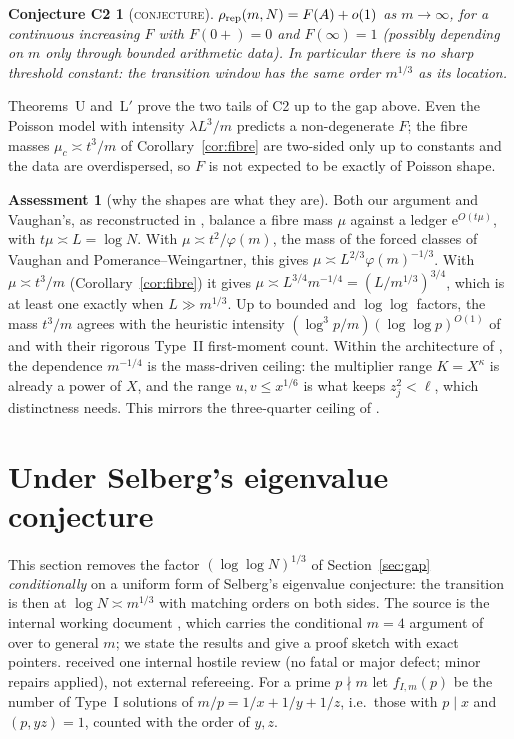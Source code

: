 \documentclass[10pt,reqno]{amsart}
\newtheorem*{conjC2}{Conjecture C2}
\theoremstyle{definition}
\newtheorem{assessment}[theorem]{Assessment}
\newcommand{\e}{\mathrm e}
\newcommand{\status}[1]{\textup{\textsc{#1}}}
\begin{document}
\begin{conjC2}[\status{conjecture}]
$\rho_{\rm rep}(m,N)=F(A)+o(1)$ as $m\to\infty$, for a continuous
increasing $F$ with $F(0+)=0$ and $F(\infty)=1$ \textup{(}possibly
depending on $m$ only through bounded arithmetic data\textup{)}.  In
particular there is no sharp threshold constant: the transition window
has the same order $m^{1/3}$ as its location.
\end{conjC2}

Theorems~U and~L$'$ prove the two tails of C2 up to the gap above.  Even
the Poisson model with intensity $\lambda L^3/m$ predicts a
non-degenerate $F$; the fibre masses $\mu_c\asymp t^3/m$ of
Corollary~\ref{cor:fibre} are two-sided only up to constants and the data
are overdispersed, so $F$ is not expected to be exactly of Poisson shape.

\begin{assessment}[why the shapes are what they are]\label{ass:shape}
Both our argument and Vaughan's, as reconstructed in \cite[\S4]{PW},
balance a fibre mass $\mu$ against a
ledger $\e^{O(t\mu)}$, with $t\mu\asymp L=\log N$.  With
$\mu\asymp t^2/\varphi(m)$, the mass of the forced classes of Vaughan and
Pomerance--Weingartner, this gives $\mu\asymp L^{2/3}\varphi(m)^{-1/3}$.
With $\mu\asymp t^3/m$ (Corollary~\ref{cor:fibre}) it gives
$\mu\asymp L^{3/4}m^{-1/4}=(L/m^{1/3})^{3/4}$, which is at least one
exactly when $L\gg m^{1/3}$.  Up to bounded and $\log\log$ factors, the
mass $t^3/m$ agrees with the heuristic intensity
$(\log^3p/m)(\log\log p)^{O(1)}$ of \cite[p.~3]{PW} and with their
rigorous Type~II first-moment count.  Within the architecture of
\cite{TQ}, the dependence $m^{-1/4}$ is the mass-driven ceiling: the
multiplier range $K=X^\kappa$ is already a power of $X$, and the range
$u,v\leq x^{1/6}$ is what keeps $z_j^2<\ell$, which distinctness needs.
This mirrors the three-quarter ceiling of \cite[\S10]{TQ}.
\end{assessment}

\section{Under Selberg's eigenvalue conjecture}\label{sec:sel}
This section removes the factor $(\log\log N)^{1/3}$ of
Section~\ref{sec:gap} \emph{conditionally} on a uniform form of Selberg's
eigenvalue conjecture: the transition is then at $\log N\asymp m^{1/3}$
with matching orders on both sides.  The source is the internal working
document \cite{MN4}, which carries the conditional $m=4$ argument of
\cite[Thm.~8.2]{HN} over to general $m$; we state the results and give a
proof sketch with exact pointers.  \cite{MN4} received one internal
hostile review (no fatal or major defect; minor repairs applied), not
external refereeing.  For a prime $p\nmid m$ let $f_{I,m}(p)$ be the
number of Type~I solutions of $m/p=1/x+1/y+1/z$, i.e.\ those with $p\mid x$
and $(p,yz)=1$, counted with the order of $y,z$.
\end{document}
